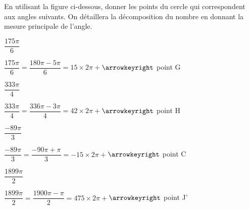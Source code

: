 \documentclass[11pt,a4paper]{article}  %
\begin{document}
En utilisant la figure ci-dessous, donner les points du cercle qui correspondent aux angles suivants. On détaillera la décomposition du nombre en donnant la mesure principale de l'angle.
	\begin{enumMet}
		\item $\dfrac{175\pi}{6}$
		\begin{corrBox}
			$\dfrac{175\pi}{6}=\dfrac{180\pi-5\pi}{6}=15\times 2\pi+$\quad $\arrowkeyright$ point G
		\end{corrBox}
		\item $\dfrac{333\pi}{4}$
		\begin{corrBox}
			$\dfrac{333\pi}{4}=\dfrac{336\pi-3\pi}{4}=42\times 2\pi+$\quad $\arrowkeyright$ point H
		\end{corrBox}
		\item $\dfrac{-89\pi}{3}$
		\begin{corrBox}
			$\dfrac{-89\pi}{3}=\dfrac{-90\pi+\pi}{3}=-15\times 2\pi+$\quad $\arrowkeyright$ point C
		\end{corrBox}
		\item {} $\dfrac{1899\pi}{2}$
		\begin{corrBox}
			$\dfrac{1899\pi}{2}=\dfrac{1900\pi-\pi}{2}=475\times 2\pi+$\quad $\arrowkeyright$ point J'
		\end{corrBox}
	\end{enumMet}
\ \\
\end{document}
